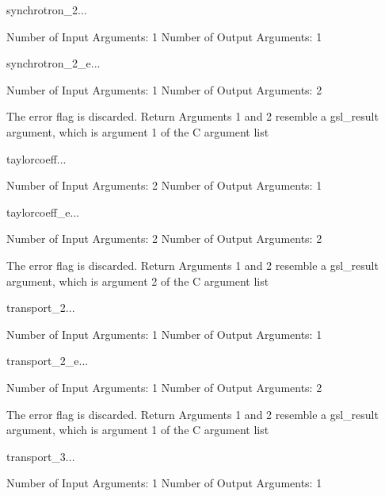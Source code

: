 \begin{funcdesc}{synchrotron_2}{...}

    Number of Input  Arguments:  1
    Number of Output Arguments:  1
\end{funcdesc}

\begin{funcdesc}{synchrotron_2_e}{...}

    Number of Input  Arguments:  1
    Number of Output Arguments:  2

The error flag is discarded.
Return Arguments 1 and 2 resemble a gsl_result argument,
	which is  argument 1 of the C argument list

\end{funcdesc}

\begin{funcdesc}{taylorcoeff}{...}

    Number of Input  Arguments:  2
    Number of Output Arguments:  1
\end{funcdesc}

\begin{funcdesc}{taylorcoeff_e}{...}

    Number of Input  Arguments:  2
    Number of Output Arguments:  2

The error flag is discarded.
Return Arguments 1 and 2 resemble a gsl_result argument,
	which is  argument 2 of the C argument list

\end{funcdesc}

\begin{funcdesc}{transport_2}{...}

    Number of Input  Arguments:  1
    Number of Output Arguments:  1
\end{funcdesc}

\begin{funcdesc}{transport_2_e}{...}

    Number of Input  Arguments:  1
    Number of Output Arguments:  2

The error flag is discarded.
Return Arguments 1 and 2 resemble a gsl_result argument,
	which is  argument 1 of the C argument list

\end{funcdesc}

\begin{funcdesc}{transport_3}{...}

    Number of Input  Arguments:  1
    Number of Output Arguments:  1
\end{funcdesc}


